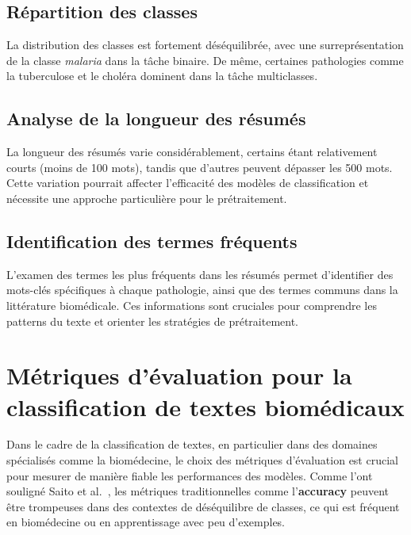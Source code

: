 \documentclass[12pt]{report}
\begin{document}
\subsection{Répartition des classes}
La distribution des classes est fortement déséquilibrée, avec une surreprésentation de la classe \textit{malaria} dans la tâche binaire. De même, certaines pathologies comme la tuberculose et le choléra dominent dans la tâche multiclasses.

\subsection{Analyse de la longueur des résumés}
La longueur des résumés varie considérablement, certains étant relativement courts (moins de 100 mots), tandis que d'autres peuvent dépasser les 500 mots. Cette variation pourrait affecter l'efficacité des modèles de classification et nécessite une approche particulière pour le prétraitement.

\subsection{Identification des termes fréquents}
L'examen des termes les plus fréquents dans les résumés permet d'identifier des mots-clés spécifiques à chaque pathologie, ainsi que des termes communs dans la littérature biomédicale. Ces informations sont cruciales pour comprendre les patterns du texte et orienter les stratégies de prétraitement.




































\section{Métriques d’évaluation pour la classification de textes biomédicaux}

Dans le cadre de la classification de textes, en particulier dans des domaines spécialisés comme la biomédecine, le choix des métriques d’évaluation est crucial pour mesurer de manière fiable les performances des modèles. Comme l’ont souligné Saito et al.~\cite{saito2015precision}, les métriques traditionnelles comme l’\textbf{accuracy} peuvent être trompeuses dans des contextes de déséquilibre de classes, ce qui est fréquent en biomédecine ou en apprentissage avec peu d’exemples.
\end{document}
